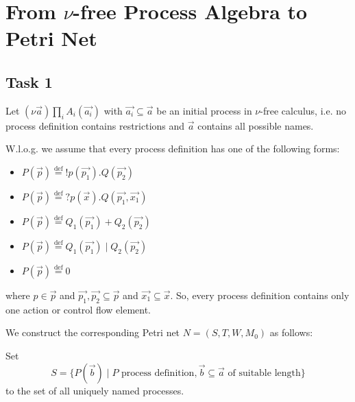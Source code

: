 \section{From $\nu$-free Process Algebra to Petri Net}
\subsection{Task 1}
Let $(\nu \vec{a}) \prod_i A_i(\vec{a_i})$ with $\vec{a_i} \subseteq \vec{a}$ be an initial process in $\nu$-free calculus, i.e. no process definition contains restrictions and $\vec{a}$ contains all possible names.

W.l.o.g. we assume that every process definition has one of the following forms:
\begin{itemize}
\item $P(\vec{p}) \stackrel{\text{def}}{=} !p(\vec{p_1}).Q(\vec{p_2})$
\item $P(\vec{p}) \stackrel{\text{def}}{=} ?p(\vec{x}).Q(\vec{p_1},\vec{x_1})$
\item $P(\vec{p}) \stackrel{\text{def}}{=} Q_1(\vec{p_1}) + Q_2(\vec{p_2})$
\item $P(\vec{p}) \stackrel{\text{def}}{=} Q_1(\vec{p_1}) \mid Q_2(\vec{p_2})$
\item $P(\vec{p}) \stackrel{\text{def}}{=} 0$
\end{itemize}
where $p \in \vec{p}$ and $\vec{p_1},\vec{p_2} \subseteq \vec{p}$ and $\vec{x_1} \subseteq \vec{x}$. So, every process definition contains only one action or control flow element.

We construct the corresponding Petri net $N = (S, T, W, M_0)$ as follows:

Set 
\[S = \{P(\vec{b}) \mid P \text{ process definition}, \vec{b} \subseteq \vec{a} \text{ of suitable length}\}\]
to the set of all uniquely named processes. 

